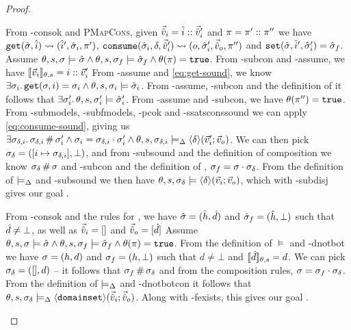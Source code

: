 \begin{proof}
\begin{hypvlist}
 From \hyp{consok} and \textsc{PMapCons}, given $\vec{\hat{v}}_i=\hat{i}::\vec{\hat{v}}_i'$ and $\pi=\pi'::\pi''$ we have $\texttt{get}(\hat{\sigma},\hat{i})\rightsquigarrow(\hat{i}', \hat{\sigma}_i, \pi')$, ${\texttt{consume}(\hat{\sigma}_i,\delta,\vec{\hat{v}}_i')\rightsquigarrow (o,\hat{\sigma}_i',\vec{\hat{v}}_o,\pi'')}$ and $\texttt{set}(\hat{\sigma},\hat{i}',\hat{\sigma}_i')=\hat{\sigma}_f$.
 Assume $\theta,s,\sigma\models \hat{\sigma} \land \theta,s,\sigma_f\models \hat{\sigma}_f \land \theta(\pi)=\texttt{true}$.
 From \hyp{subcon} and \hyp{assume}, we have $\llbracket\vec{v}_i\rrbracket_{\theta,s}=i::\vec{v}_i'$
 From \hyp{assume} and \ref{eq:get-sound}, we know $\exists \sigma_i\ldotp \texttt{get}(\sigma,i)=\sigma_i \land \theta,s,\sigma_i\models\hat{\sigma}_i$.
 From \hyp{assume}, \hyp{subcon} and the definition of  it follows that $\exists \sigma_i'\ldotp \theta,s,\sigma_i'\models\hat{\sigma}_i'$.
 From \hyp{assume} and \hyp{subcon}, we have $\theta(\pi'')=\texttt{true}$.
 From \hyp{submodels}, \hyp{subfmodels}, \hyp{pcok} and \hyp{ssatsconssound} we can apply \ref{eq:consume-sound}, giving us $\exists \sigma_{\delta,i}\ldotp \sigma_{\delta,i}\operatorname{\#} \sigma_i' \land \sigma_i=\sigma_{\delta,i}\cdot\sigma_i' \land \theta,s,\sigma_{\delta,i}\models_{\Delta} \left<\delta\right>\!(\vec{v}_i';\vec{v}_o)$.
 We can then pick $\sigma_\delta=([i\mapsto \sigma_{\delta,i}], \bot)$, and from \hyp{subsound} and the definition of composition we know $\sigma_\delta\operatorname{\#}\sigma$ and \hyp{subcon} and the definition of , $\sigma_f=\sigma\cdot\sigma_\delta$.
 From the definition of $\models_{\Delta}$ and \hyp{subsound} we then have $\theta,s,\sigma_\delta\models\left<\delta\right>\!(\vec{v}_i;\vec{v}_o)$, which with \hyp{subdisj} gives our goal .
\end{hypvlist}

\pfcase{$\delta = \domainset$}

\begin{hypvlist}
 From \hyp{consok} and the rules for \consume{}, we have $\hat{\sigma}=(\hat{h},\hat{d})$ and $\hat{\sigma}_f=(\hat{h},\bot)$ such that $\hat{d}\neq\bot$, as well as $\vec{\hat{v}}_i=[]$ and $\vec{\hat{v}}_o=[\hat{d}]$
 Assume $\theta,s,\sigma\models \hat{\sigma} \land \theta,s,\sigma_f\models \hat{\sigma}_f \land \theta(\pi)=\texttt{true}$.
 From the definition of $\models$ and \hyp{dnotbot} we have $\sigma=(h,d)$ and $\sigma_f=(h,\bot)$ such that $d\neq\bot$ and $\llbracket\hat{d}\rrbracket_{\theta,s}=d$.
 We can pick $\sigma_\delta=([],d)$ -- it follows that $\sigma_f\operatorname{\#}\sigma_\delta$ and from the composition rules, $\sigma=\sigma_f\cdot\sigma_\delta$.
 From the definition of $\models_{\Delta}$ and \hyp{dnotbotcon} it follows that $\theta,s,\sigma_\delta\models_{\Delta}\left<\texttt{domainset}\right>\!(\vec{\hat{v}}_i;\vec{\hat{v}}_o)$. Along with \hyp{fexists}, this gives our goal .
\end{hypvlist}


\end{proof}
